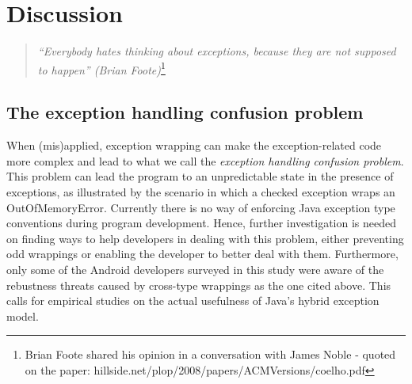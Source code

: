 \section{Discussion}
\label{sec:disc}

\begin{quotation}
\noindent
 \emph{``Everybody hates thinking about exceptions, because they are not supposed to happen'' 
  (Brian Foote)}\footnote{Brian Foote shared his opinion in a conversation with James Noble - quoted on the paper: hillside.net/plop/2008/papers/ACMVersions/coelho.pdf}
\end{quotation}


\subsection{The exception handling confusion problem}
When (mis)applied, exception wrapping can make the exception-related code
 more complex and lead to what we call the \emph{exception handling confusion problem}.
This problem can lead the program to an unpredictable state in the presence of exceptions,
as illustrated by the scenario in which a checked exception wraps an OutOfMemoryError. 
Currently there is no way of enforcing Java exception type conventions during program development.
Hence, further investigation is needed on finding ways to help developers in dealing with this
 problem, either preventing odd wrappings or enabling the developer to
 better deal with them.
Furthermore, only some of the Android developers surveyed in this study were aware of the 
rebustness threats caused by cross-type wrappings as the one cited above. This calls for empirical studies on the actual usefulness of Java's hybrid exception model. 


